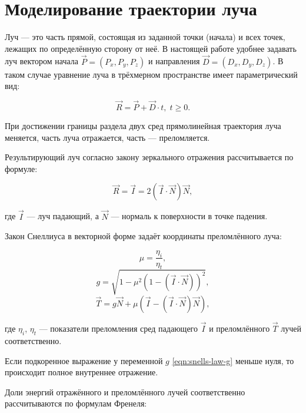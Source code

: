 \section{Моделирование траектории луча}

Луч — это часть прямой, состоящая из заданной точки (начала) и всех точек, лежащих по определённую сторону от неё.
В настоящей работе удобнее задавать луч вектором начала $\vec P = (P_x, P_y, P_z)$ и направления $\vec D = (D_x, D_y, D_z)$.
В таком случае уравнение луча в трёхмерном пространстве имеет параметрический вид:

\begin{equation}
	\vec R = \vec P + \vec D \cdot t, \; t \geqslant 0.
\end{equation}

При достижении границы раздела двух сред прямолинейная траектория луча меняется, часть луча отражается, часть — преломляется.

Результирующий луч согласно закону зеркального отражения рассчитывается по формуле:

\begin{equation}
	\label{eqn:reflection}
	\vec R = \vec I = 2\left(\vec I \cdot \vec N\right)\vec N,
\end{equation}

\noindent где $\vec I$ — луч падающий, а $\vec N$ — нормаль к поверхности в точке падения.

Закон Снеллиуса в векторной форме задаёт координаты преломлённого луча:

\begin{equation}
	\label{eqn:refraction-begin}
	\mu = \frac{\eta_i}{\eta_t},
\end{equation}
\begin{equation}
	\label{eqn:snells-law-g}
	g = \sqrt{1 - \mu^2\left(1 - \left(\vec I \cdot \vec N\right)\right)^2},
\end{equation}
\begin{equation}
	\vec T = g \vec N + \mu \left(\vec I - \left(\vec I \cdot \vec N\right) \vec N\right),
\end{equation}

\noindent где $\eta_i$, $\eta_t$ — показатели преломления сред падающего $\vec I$ и преломлённого $\vec T$ лучей соответственно.

Если подкоренное выражение у переменной $g$ \eqref{eqn:snells-law-g} меньше нуля, то происходит полное внутреннее отражение.

Доли энергий отражённого и преломлённого лучей соответственно рассчитываются по формулам Френеля:

